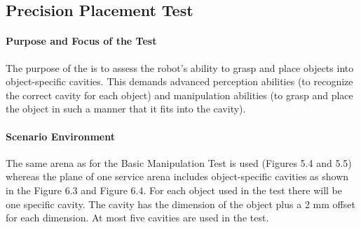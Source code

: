 \newpage
\subsection{Precision Placement Test}

\paragraph{Purpose and Focus of the Test}
The purpose of the  is to assess the robot’s ability to grasp and place objects into object-specific cavities. This demands advanced perception abilities (to recognize the correct cavity for each object) and manipulation abilities (to grasp and place the object in such a manner that it fits into the cavity).

\paragraph{Scenario Environment}
The same arena as for the Basic Manipulation Test is used (Figures 5.4 and 5.5) whereas the plane of one service arena includes object-specific cavities as shown in the Figure 6.3 and Figure 6.4. For each object used in the test there will be one specific cavity. The cavity has the dimension of the object plus a 2 mm offset for each dimension. At most five cavities are used in the test.


